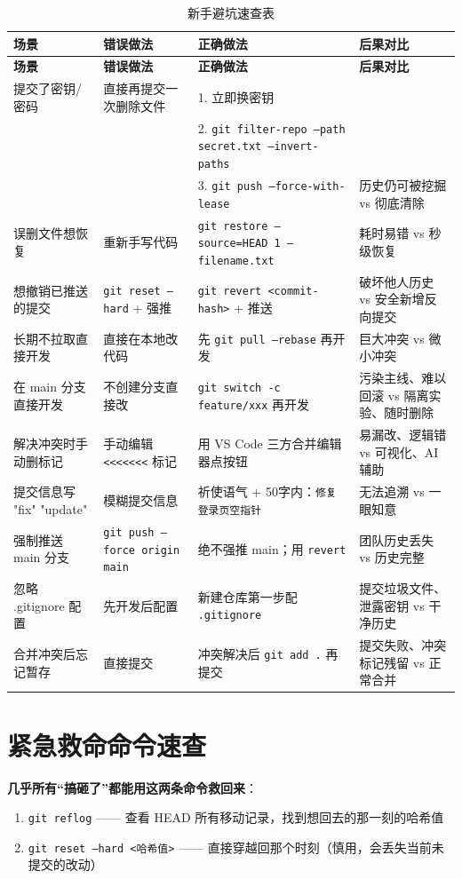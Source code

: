 \documentclass[12pt,a4paper,openany]{ctexbook}
\begin{document}
\begin{longtable}{p{2.8cm} p{3.5cm} p{3.5cm} p{4.5cm}}
\caption{新手避坑速查表}\label{tab:pitfalls}\\
\toprule
\textbf{场景} & \textbf{错误做法} & \textbf{正确做法} & \textbf{后果对比} \\
\midrule
\endfirsthead
\toprule
\textbf{场景} & \textbf{错误做法} & \textbf{正确做法} & \textbf{后果对比} \\
\midrule
\endhead
提交了密钥/密码 & 直接再提交一次删除文件 & 1. 立即换密钥\\
& & 2. \texttt{git filter-repo --path secret.txt --invert-paths}\\
& & 3. \texttt{git push --force-with-lease} & 历史仍可被挖掘 vs 彻底清除 \\
误删文件想恢复 & 重新手写代码 & \texttt{git restore --source=HEAD~1 -- filename.txt} & 耗时易错 vs 秒级恢复 \\
想撤销已推送的提交 & \texttt{git reset --hard} + 强推 & \texttt{git revert <commit-hash>} + 推送 & 破坏他人历史 vs 安全新增反向提交 \\
长期不拉取直接开发 & 直接在本地改代码 & 先 \texttt{git pull --rebase} 再开发 & 巨大冲突 vs 微小冲突 \\
在 main 分支直接开发 & 不创建分支直接改 & \texttt{git switch -c feature/xxx} 再开发 & 污染主线、难以回滚 vs 隔离实验、随时删除 \\
解决冲突时手动删标记 & 手动编辑 \texttt{<<<<<<<} 标记 & 用 VS Code 三方合并编辑器点按钮 & 易漏改、逻辑错 vs 可视化、AI 辅助 \\
提交信息写 "fix" "update" & 模糊提交信息 & 祈使语气 + 50字内：\texttt{修复登录页空指针} & 无法追溯 vs 一眼知意 \\
强制推送 main 分支 & \texttt{git push --force origin main} & 绝不强推 main；用 \texttt{revert} & 团队历史丢失 vs 历史完整 \\
忽略 .gitignore 配置 & 先开发后配置 & 新建仓库第一步配 \texttt{.gitignore} & 提交垃圾文件、泄露密钥 vs 干净历史 \\
合并冲突后忘记暂存 & 直接提交 & 冲突解决后 \texttt{git add .} 再提交 & 提交失败、冲突标记残留 vs 正常合并 \\
\bottomrule
\end{longtable}

\section{紧急救命命令速查}

\begin{infobox}
\textbf{几乎所有“搞砸了”都能用这两条命令救回来}：
\begin{enumerate}[leftmargin=1.5em]
  \item \texttt{git reflog} —— 查看 HEAD 所有移动记录，找到想回去的那一刻的哈希值
  \item \texttt{git reset --hard <哈希值>} —— 直接穿越回那个时刻（慎用，会丢失当前未提交的改动）
\end{enumerate}
\end{infobox}
\end{document}
